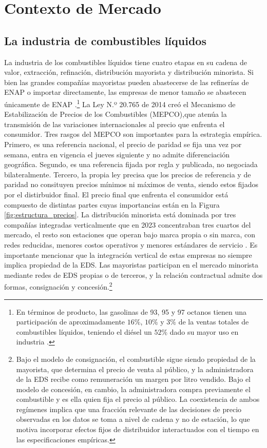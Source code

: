 \section{Contexto de Mercado} \label{sec:mercado}

\subsection{La industria de combustibles líquidos}

La industria de los combustibles líquidos tiene cuatro etapas en su cadena de valor, extracción, refinación, distribución mayorista y distribución minorista. Si bien las grandes compañías mayoristas pueden abastecerse de las refinerías de ENAP o importar directamente, las empresas de menor tamaño se abastecen únicamente de ENAP \parencite{FNE2025informe}.\footnote{En términos de producto, las gasolinas de 93, 95 y 97 octanos tienen una participación de aproximadamente $16\%$, $10\%$ y $3\%$ de la ventas totales de combustibles líquidos, teniendo el diésel un $52\%$ dado su mayor uso en industria \parencite{FNE2025informe}.} La Ley N.º 20.765 de 2014 creó el Mecanismo de Estabilización de Precios de los Combustibles (MEPCO),que atenúa la transmisión de las variaciones internacionales al precio que enfrenta el consumidor. Tres rasgos del MEPCO son importantes para la estrategia empírica. Primero, es una referencia nacional, el precio de paridad se fija una vez por semana, entra en vigencia el jueves siguiente y no admite diferenciación geográfica. Segundo, es una referencia fijada por regla y publicada, no negociada bilateralmente. Tercero, la propia ley precisa que los precios de referencia y de paridad no consituyen precios mínimos ni máximos de venta, siendo estos fijados por el distirbuidor final. El precio final que enfrenta el consumidor está compuesto de distintas partes cuyas importancias están en la Figura \ref{fig:estructura_precios}.
La distribución minorista está dominada por tres compañías integradas verticalmente que en 2023 concentraban tres cuartos del mercado, el resto son estaciones que operan bajo marca propia o sin marca, con redes reducidas, menores costos operativos y menores estándares de servicio \parencite{FNE2025informe}. Es importante mencionar que la integración vertical de estas empresas no siempre implica propiedad de la EDS. Las mayoristas participan en el mercado minorista mediante redes de EDS propias o de terceros, y la relación contractual admite dos formas, consignación y concesión.\footnote{Bajo el modelo de consignación, el combustible sigue siendo propiedad de la mayorista, que determina el precio de venta al público, y la administradora de la EDS recibe como remuneración un margen por litro vendido. Bajo el modelo de concesión, en cambio, la administradora compra previamente el combustible y es ella quien fija el precio al público. La coexistencia de ambos regímenes implica que una fracción relevante de las decisiones de precio observadas en los datos se toma a nivel de cadena y no de estación, lo que motiva incorporar efectos fijos de distribuidor interactuados con el tiempo en las especificaciones empíricas.}

